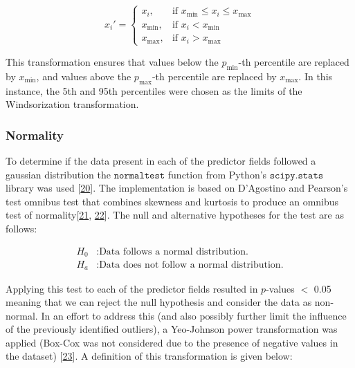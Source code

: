 \documentclass[11pt, oneside]{article}   	%
\begin{document}
 
\begin{equation}
x_i' = 
\begin{cases} 
x_i, & \text{if }  x_{\text{min}} \leq x_i \leq  x_{\text{max}} \\
x_{\text{min}}, & \text{if } x_i <  x_{\text{min}} \\
x_{\text{max}}, & \text{if } x_i >  x_{\text{max}}
\end{cases}
\end{equation}

This transformation ensures that values below the $p_{\text{min}}$-th percentile are replaced by $x_{\text{min}}$, and values above the $p_{\text{max}}$-th percentile are replaced by $x_{\text{max}}$. In this instance, the 5th and 95th percentiles were chosen as the limits of the Windsorization transformation. \\




\subsubsection{Normality}

To determine if the data present in each of the predictor fields followed a gaussian distribution the $\texttt{normaltest}$ function from Python's $\texttt{scipy.stats}$ library was used [\href{https://www.nature.com/articles/s41592-019-0686-2}{20}]. The implementation is based on D'Agostino and Pearson's test omnibus test that combines skewness and kurtosis to produce an omnibus test of normality[\href{https://doi.org/10.2307/2334522}{21}, \href{https://doi.org/10.2307/2335012}{22}]. The null and alternative hypotheses for the test are as follows:

\begin{align}
H_0 &: \text{Data follows a normal distribution.} \\
H_a &: \text{Data does not follow a normal distribution.}
\end{align}


Applying this test to each of the predictor fields resulted in $p$-values $<$ 0.05 meaning that we can reject the null hypothesis and consider the data as non-normal. In an effort to address this (and also possibly further limit the influence of the previously identified outliers), a Yeo-Johnson power transformation was applied (Box-Cox was not considered due to the presence of negative values in the dataset) [\href{https://doi.org/10.1093/biomet/87.4.954}{23}]. A definition of this transformation is given below:
\end{document}
